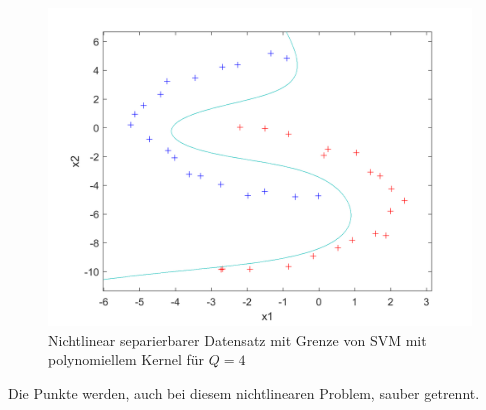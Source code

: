 \documentclass[a4paper,11pt,twoside]{scrreprt}
\begin{document}
\begin{figure}[H]
    \centering
    \includegraphics[width = 16cm]{../code/octave/images/sgddatasetkernelsolve}
    \caption{Nichtlinear separierbarer Datensatz mit Grenze von \ac{SVM} mit polynomiellem Kernel für $Q=4$}
    \label{fig:plykern_solve}
\end{figure}
Die Punkte werden, auch bei diesem nichtlinearen Problem, sauber getrennt.
\end{document}
